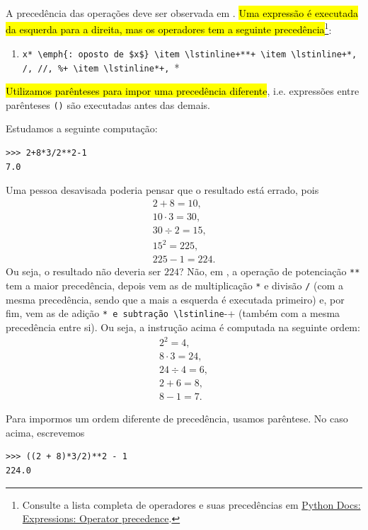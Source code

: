A precedência das operações deve ser observada em {\python}. \hl{Uma expressão é executada da esquerda para a direita, mas os operadores tem a seguinte precedência}\footnote{Consulte a lista completa de operadores e suas precedências em \href{https://docs.python.org/3/reference/expressions.html\#operator-precedence}{Python Docs: Expressions: Operator precedence}.}:
\begin{enumerate}
\item \lstinline*-x* \emph{: oposto de $x$}
\item \lstinline+**+
\item \lstinline+*, /, //, %+
\item \lstinline*+, -*
\end{enumerate}
\hl{Utilizamos parênteses para impor uma precedência diferente}, i.e. expressões entre parênteses \lstinline+()+ são executadas antes das demais.

\begin{ex}
  Estudamos a seguinte computação:
\begin{lstlisting}
>>> 2+8*3/2**2-1
7.0
\end{lstlisting}

  Uma pessoa desavisada poderia pensar que o resultado está errado, pois
  \begin{gather}
    2+8 = 10,\\
    10 \cdot 3 = 30,\\
    30 \div 2 = 15,\\
    15^2 = 225,\\
    225 - 1 = 224.
  \end{gather}
  Ou seja, o resultado não deveria ser $224$? Não, em {\python}, a operação de potenciação \lstinline+**+ tem a maior precedência, depois vem as de multiplicação \lstinline+*+ e divisão \lstinline+/+ (com a mesma precedência, sendo que a mais a esquerda é executada primeiro) e, por fim, vem as de adição \lstinline*+* e subtração \lstinline+-+ (também com a mesma precedência entre si). Ou seja, a instrução acima é computada na seguinte ordem:
  \begin{gather}
    2^2 = 4,\\
    8\cdot 3 = 24,\\
    24\div 4 = 6,\\
    2 + 6 = 8,\\
    8 - 1 = 7.
  \end{gather}

  Para impormos um ordem diferente de precedência, usamos parêntese. No caso acima, escrevemos
\begin{lstlisting}
>>> ((2 + 8)*3/2)**2 - 1
224.0
\end{lstlisting}
\end{ex}

